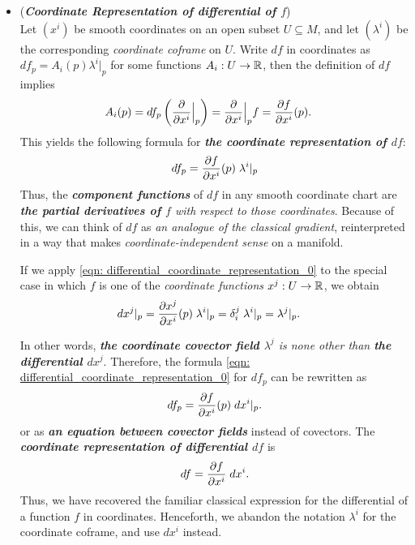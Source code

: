 \documentclass[11pt]{article}
\begin{document}
\begin{itemize}
\item \begin{remark} (\emph{\textbf{Coordinate Representation of differential of $f$}})\\
Let $(x^i)$ be smooth coordinates on an open subset $U \subseteq M$, and let $(\lambda^i)$ be the corresponding \emph{coordinate coframe} on $U$. Write $df$ in coordinates as $df_p = A_i(p) \lambda^i |_p$ for some functions $A_i: U \rightarrow {\mathbb R}$,  then the definition of $df$ implies
\begin{align*}
A_i(p) &= df_{p}\left(\frac{\partial }{ \partial x^{i}}\Bigr|_{p}\right) = \frac{\partial }{ \partial x^{i}}\Bigr|_{p} f = \frac{\partial f}{ \partial x^{i}}(p).
\end{align*} This yields the following formula for \emph{\textbf{the coordinate representation of $df$}}:
\begin{align}
df_p = \frac{\partial f}{ \partial x^{i}}(p) \; \lambda^i |_p \label{eqn: differential_coordinate_representation_0}
\end{align} Thus, the \emph{\textbf{component functions}} of $df$ in any smooth coordinate chart are \emph{\textbf{the partial derivatives of $f$} with respect to those coordinates}. Because of this, we can think of $df$ as \emph{an analogue of the classical gradient}, reinterpreted in a way that makes \emph{coordinate-independent sense} on a manifold.

If we apply \eqref{eqn: differential_coordinate_representation_0} to the special case in which $f$ is one of the \emph{coordinate functions} $x^j: U \rightarrow {\mathbb R}$, we obtain
\begin{align*}
d x^{j} |_p  &= \frac{\partial x^{j}}{ \partial x^{i}}(p) \; \lambda^i |_p = \delta_{i}^{j}\; \lambda^i |_p =  \lambda^j |_p.
\end{align*}

In other words, \emph{\textbf{the coordinate covector field $\lambda^j$} is none other than \textbf{the differential $dx^j$}}. Therefore, the formula \eqref{eqn: differential_coordinate_representation_0} for $df_p$ can be rewritten as
\begin{align}
df_p = \frac{\partial f}{ \partial x^{i}}(p) \; d x^{i} |_p.   \label{eqn: differential_coordinate_representation_1}
\end{align} or as \emph{\textbf{an equation between covector fields}} instead of covectors. The \emph{\textbf{coordinate representation of differential $df$}} is
\begin{align}
df = \frac{\partial f}{ \partial x^{i}} \; d x^{i}.   \label{eqn: differential_coordinate_representation}
\end{align} Thus, we have recovered the familiar classical expression for the differential of a
function $f$ in coordinates. Henceforth, we abandon the notation $\lambda^i$ for the coordinate coframe, and use $dx^i$ instead. 


\end{remark}
\end{itemize}
\end{document}
